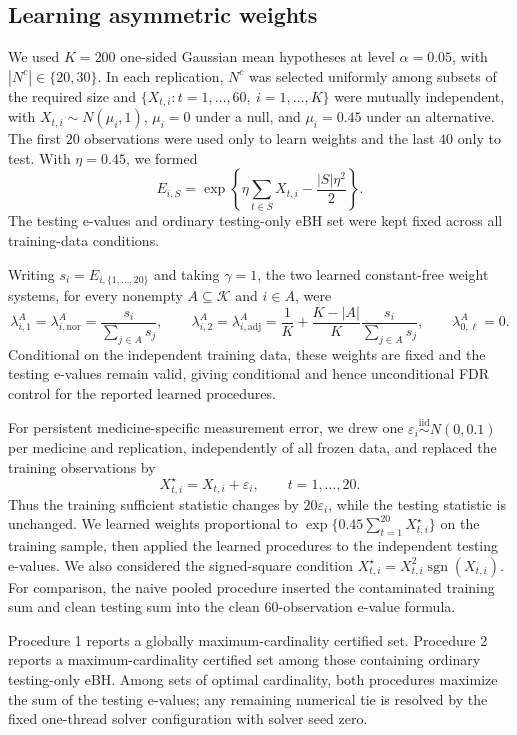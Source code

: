 \subsection{Learning asymmetric weights}

We used $K=200$ one-sided Gaussian mean hypotheses at level $\alpha=0.05$,
with $|N^c|\in\{20,30\}$. In each replication, $N^c$ was selected uniformly
among subsets of the required size and
$\{X_{t,i}:t=1,\ldots,60,\ i=1,\ldots,K\}$ were mutually independent, with
$X_{t,i}\sim N(\mu_i,1)$, $\mu_i=0$ under a null, and $\mu_i=0.45$ under an
alternative. The first $20$ observations were used only to learn weights and
the last $40$ only to test. With $\eta=0.45$, we formed
\[
 E_{i,S}=\exp\left\{\eta\sum_{t\in S}X_{t,i}
                -\frac{|S|\eta^2}{2}\right\}.
\]
The testing e-values and ordinary testing-only eBH set were kept fixed across
all training-data conditions.

Writing $s_i=E_{i,\{1,\ldots,20\}}$ and taking $\gamma=1$, the two learned
constant-free weight systems, for every nonempty $A\subseteq\mathcal K$ and
$i\in A$, were
\[
 \lambda^A_{i,1}=\lambda^A_{i,\mathrm{nor}}
   =\frac{s_i}{\sum_{j\in A}s_j},\qquad
 \lambda^A_{i,2}=\lambda^A_{i,\mathrm{adj}}
   =\frac1K+\frac{K-|A|}{K}\frac{s_i}{\sum_{j\in A}s_j},
 \qquad \lambda^A_{0,\ell}=0.
\]
Conditional on the independent training data, these weights are fixed and the
testing e-values remain valid, giving conditional and hence unconditional FDR
control for the reported learned procedures.

For persistent medicine-specific measurement error, we drew one
$\varepsilon_i\stackrel{\mathrm{iid}}{\sim}N(0,0.1)$ per medicine and replication,
independently of all frozen data, and replaced the training observations by
\[
  X^{\star}_{t,i}=X_{t,i}+\varepsilon_i,
  \qquad t=1,\ldots,20.
\]
Thus the training sufficient statistic changes by $20\varepsilon_i$, while the
testing statistic is unchanged.  We learned weights proportional to
$\exp\{0.45\sum_{t=1}^{20}X^{\star}_{t,i}\}$ on the training sample, then applied
the learned procedures to the independent testing e-values. We also considered the
signed-square condition $X^\star_{t,i}=X_{t,i}^2\operatorname{sgn}(X_{t,i})$.
For comparison, the naive pooled procedure inserted the contaminated training
sum and clean testing sum into the clean 60-observation e-value formula.

Procedure 1 reports a globally maximum-cardinality certified set. Procedure 2
reports a maximum-cardinality certified set among those containing ordinary
testing-only eBH. Among sets of optimal cardinality, both procedures maximize
the sum of the testing e-values; any remaining numerical tie is resolved by the
fixed one-thread solver configuration with solver seed zero.

